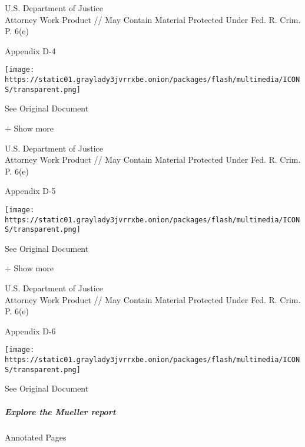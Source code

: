 U.S. Department of Justice\\
Attorney Work Product // May Contain Material Protected Under Fed. R.
Crim. P. 6(e)

Appendix D-4

\protect\hyperlink{}{}

\texttt{[image: https://static01.graylady3jvrrxbe.onion/packages/flash/multimedia/ICONS/transparent.png]}

See Original Document

+ Show more

U.S. Department of Justice\\
Attorney Work Product // May Contain Material Protected Under Fed. R.
Crim. P. 6(e)

Appendix D-5

\protect\hyperlink{}{}

\texttt{[image: https://static01.graylady3jvrrxbe.onion/packages/flash/multimedia/ICONS/transparent.png]}

See Original Document

+ Show more

U.S. Department of Justice\\
Attorney Work Product // May Contain Material Protected Under Fed. R.
Crim. P. 6(e)

Appendix D-6

\protect\hyperlink{}{}

\texttt{[image: https://static01.graylady3jvrrxbe.onion/packages/flash/multimedia/ICONS/transparent.png]}

See Original Document

\hypertarget{explore-the-mueller-report}{%
\subparagraph{Explore the Mueller
report}\label{explore-the-mueller-report}}

Annotated Pages

